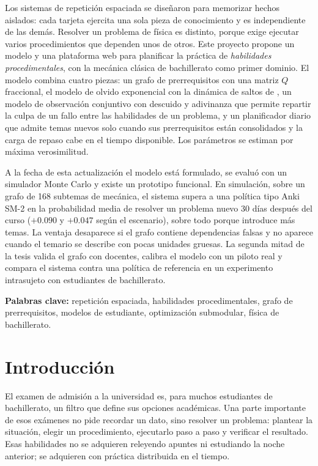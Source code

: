 \documentclass[12pt]{article}
\theoremstyle{definition}
\begin{document}
Los sistemas de repetición espaciada se diseñaron para memorizar hechos aislados: cada tarjeta ejercita una sola pieza de conocimiento y es independiente de las demás. Resolver un problema de física es distinto, porque exige ejecutar varios procedimientos que dependen unos de otros. Este proyecto propone un modelo y una plataforma web para planificar la práctica de \emph{habilidades procedimentales}, con la mecánica clásica de bachillerato como primer dominio. El modelo combina cuatro piezas: un grafo de prerrequisitos con una matriz $Q$ fraccional, el modelo de olvido exponencial con la dinámica de saltos de \citet{tabibian2019}, un modelo de observación conjuntivo con descuido y adivinanza que permite repartir la culpa de un fallo entre las habilidades de un problema, y un planificador diario que admite temas nuevos solo cuando sus prerrequisitos están consolidados y la carga de repaso cabe en el tiempo disponible. Los parámetros se estiman por máxima verosimilitud.

A la fecha de esta actualización el modelo está formulado, se evaluó con un simulador Monte Carlo y existe un prototipo funcional. En simulación, sobre un grafo de 168 subtemas de mecánica, el sistema supera a una política tipo Anki SM-2 en la probabilidad media de resolver un problema nuevo 30 días después del curso ($+0.090$ y $+0.047$ según el escenario), sobre todo porque introduce más temas. La ventaja desaparece si el grafo contiene dependencias falsas y no aparece cuando el temario se describe con pocas unidades gruesas. La segunda mitad de la tesis valida el grafo con docentes, calibra el modelo con un piloto real y compara el sistema contra una política de referencia en un experimento intrasujeto con estudiantes de bachillerato.

\vspace{0.5cm}
\noindent\textbf{Palabras clave:} repetición espaciada, habilidades procedimentales, grafo de prerrequisitos, modelos de estudiante, optimización submodular, física de bachillerato.

\newpage
\tableofcontents
\newpage

\section{Introducción}

El examen de admisión a la universidad es, para muchos estudiantes de bachillerato, un filtro que define sus opciones académicas. Una parte importante de esos exámenes no pide recordar un dato, sino resolver un problema: plantear la situación, elegir un procedimiento, ejecutarlo paso a paso y verificar el resultado. Esas habilidades no se adquieren releyendo apuntes ni estudiando la noche anterior; se adquieren con práctica distribuida en el tiempo.
\end{document}
